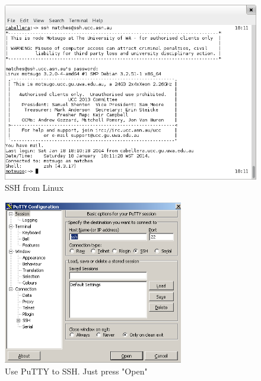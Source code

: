 \begin{mdframed}

\begin{figure}[H]
	\centering
	\includegraphics[width=1.0\textwidth]{figures/ssh.png}
	\caption{SSH from Linux} 
	\label{ssh.png}
\end{figure}

\begin{figure}[H]
	\centering
	\includegraphics[width=0.7\textwidth]{figures/putty.png}
	\caption{Use PuTTY to SSH. Just press "Open"} 
	\label{putty.png}
\end{figure}

\end{mdframed}
